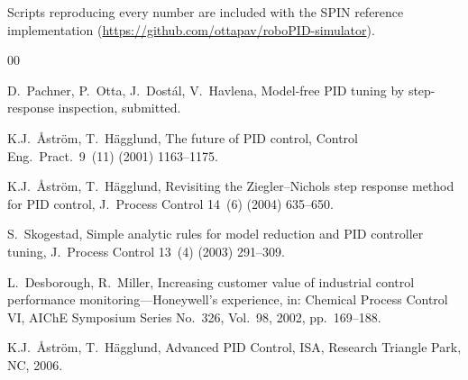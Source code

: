 \documentclass[final,3p,times,twocolumn]{elsarticle}
\newcommand{\spin}{SPIN\xspace}
\begin{document}
Scripts reproducing every number are included with the \spin reference
implementation
(\url{https://github.com/ottapav/roboPID-simulator}).

\begin{thebibliography}{00}

 D.~Pachner, P.~Otta, J.~Dost\'al, V.~Havlena, Model-free
PID tuning by step-response inspection, submitted.

 K.J.~\r{A}str\"om, T.~H\"agglund, The future
of PID control, Control Eng.\ Pract.\ 9~(11) (2001) 1163--1175.

 K.J.~\r{A}str\"om, T.~H\"agglund,
Revisiting the Ziegler--Nichols step response method for PID control,
J.~Process Control 14~(6) (2004) 635--650.

 S.~Skogestad, Simple analytic rules for model
reduction and PID controller tuning, J.~Process Control 13~(4) (2003)
291--309.

 L.~Desborough, R.~Miller, Increasing customer
value of industrial control performance monitoring---Honeywell's
experience, in: Chemical Process Control VI, AIChE Symposium Series
No.~326, Vol.~98, 2002, pp.~169--188.

 K.J.~\r{A}str\"om, T.~H\"agglund,
Advanced PID Control, ISA, Research Triangle Park, NC, 2006.

\end{thebibliography}
\end{document}
